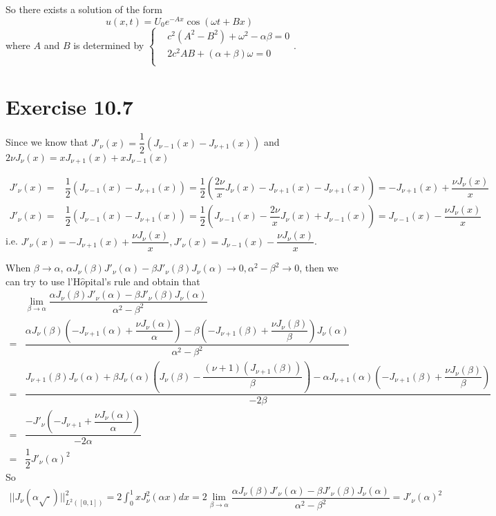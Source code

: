 \documentclass[a4paper,12pt,titlepage]{article}
\begin{document}
So there exists a solution  of the form
$$u(x,t)=U_0e^{-Ax}\cos(\omega t+Bx)$$
where $A$ and $B$ is determined by $\left\{
\begin{aligned}
&c^2(A^2-B^2)+\omega^2-\alpha\beta=0\\
&2c^2AB+(\alpha+\beta)\omega=0\\
\end{aligned}
\right.$.










\section*{Exercise 10.7}
Since we know that $J'_{\nu}(x)=\dfrac{1}{2}(J_{\nu-1}(x)-J_{\nu+1}(x))$ and $ 2\nu J_{\nu}(x)=xJ_{\nu+1}(x)+xJ_{\nu-1}(x) $

\begin{align*}
J'_{\nu}(x)=&\dfrac{1}{2}(J_{\nu-1}(x)-J_{\nu+1}(x))=\dfrac{1}{2}(\dfrac{2\nu}{x}J_{\nu}(x)-J_{\nu+1}(x)-J_{\nu+1}(x))=-J_{\nu+1}(x)+\dfrac{\nu J_{\nu}(x)}{x}
\end{align*}
\begin{align*}
J'_{\nu}(x)=&\dfrac{1}{2}(J_{\nu-1}(x)-J_{\nu+1}(x))=\dfrac{1}{2}(J_{\nu-1}(x)-\dfrac{2\nu}{x}J_{\nu}(x)+J_{\nu-1}(x))=J_{\nu-1}(x)-\dfrac{\nu J_{\nu}(x)}{x}
\end{align*}
i.e. $J'_{\nu}(x)=-J_{\nu+1}(x)+\dfrac{\nu J_{\nu}(x)}{x},J'_{\nu}(x)=J_{\nu-1}(x)-\dfrac{\nu J_{\nu}(x)}{x}$. 

When $\beta\rightarrow \alpha$, $\alpha J_{\nu}(\beta)J'_{\nu}(\alpha)-\beta J'_{\nu}(\beta)J_{\nu}(\alpha)\rightarrow0,\alpha^2-\beta^2\rightarrow0$, then we can try to use l'H$\hat{o}$pital's rule and obtain that
\begin{align*}
&\lim_{\beta\rightarrow\alpha}\dfrac{\alpha J_{\nu}(\beta)J'_{\nu}(\alpha)-\beta J'_{\nu}(\beta)J_{\nu}(\alpha)}{\alpha^2-\beta^2}\\
=& \dfrac{\alpha J_{\nu}(\beta)(-J_{\nu+1}(\alpha)+\dfrac{\nu J_{\nu}(\alpha)}{\alpha})-\beta (-J_{\nu+1}(\beta)+\dfrac{\nu J_{\nu}(\beta)}{\beta})J_{\nu}(\alpha)}{\alpha^2-\beta^2}\\
=&\dfrac{J_{\nu+1}(\beta)J_{\nu}(\alpha)+\beta J_{\nu}(\alpha)(J_{\nu}(\beta)-\dfrac{(\nu+1)(J_{\nu+1}(\beta))}{\beta})-\alpha J_{\nu+1}(\alpha)(-J_{\nu+1}(\beta)+\dfrac{\nu J_{\nu}(\beta)}{\beta})}{-2\beta}\\
=&\dfrac{-J'_{\nu}(-J_{\nu+1}+\dfrac{\nu J_{\nu}(\alpha)}{\alpha})}{-2\alpha}\\
=&\dfrac{1}{2}J'_{\nu}(\alpha)^2
\end{align*}
So 
\begin{align*}
||J_{\nu}(\alpha\sqrt{\cdot})||^2_{L^2([0,1])}=2\int_0^1xJ^2_{\nu}(\alpha x)dx=2\lim_{\beta\rightarrow\alpha}\dfrac{\alpha J_{\nu}(\beta)J'_{\nu}(\alpha)-\beta J'_{\nu}(\beta)J_{\nu}(\alpha)}{\alpha^2-\beta^2}=J'_{\nu}(\alpha)^2
\end{align*}
\end{document}
